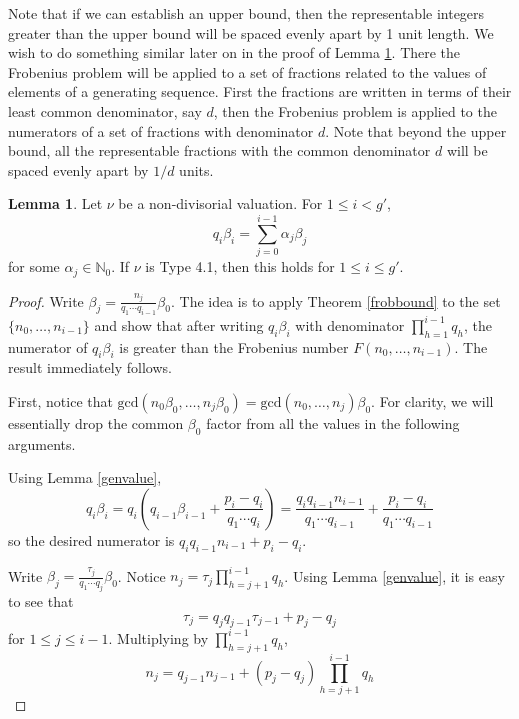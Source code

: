 \documentclass[11pt]{amsart}
\theoremstyle{definition}
\newtheorem{lem}[thm]{Lemma}
\begin{document}
{Note that if we can establish an upper bound, then the representable integers greater than the upper bound will be spaced evenly apart by 1 unit length. We wish to do something similar later on in the proof of Lemma \ref{lowerbeta}. There the Frobenius problem will be applied to a set of fractions related to the values of elements of a generating sequence. First the fractions are written in terms of their least common denominator, say $d$, then the Frobenius problem is applied to the numerators of a set of fractions with denominator $d$. Note that beyond the upper bound, all the representable fractions with the common denominator $d$ will be spaced evenly apart by $1/d$ units.

\begin{lem} \label{lowerbeta} Let $\nu$ be a non-divisorial valuation. For $1\leq i < g'$,
\begin{equation} \label{qibetai}
q_i \beta_i=\sum_{j=0}^{i-1} \alpha_j\beta_j
\end{equation}
for some $\alpha_j\in\mathbb{N}_0$. If $\nu$ is Type 4.1, then this holds for $1\leq i\leq g'$.
\end{lem}
\begin{proof}
Write $\displaystyle \beta_j=\frac{n_j}{q_1\cdots q_{i-1}}\beta_0$. The idea is to apply Theorem \ref{frobbound} to the set $\{n_0,\ldots,n_{i-1}\}$ and show that after writing $q_i\beta_i$ with denominator $\prod_{h=1}^{i-1} q_h$, the numerator of $q_i\beta_i$ is greater than the Frobenius number $F(n_0,\ldots,n_{i-1})$. The result immediately follows.

First, notice that $\text{gcd}(n_0\beta_0,\ldots,n_j\beta_0)=\text{gcd}(n_0,\ldots,n_j)\beta_0$. For clarity, we will essentially drop the common $\beta_0$ factor from all the values in the following arguments.

Using Lemma \ref{genvalue},
\begin{equation*}
q_i\beta_i=q_i\left(q_{i-1}\beta_{i-1}+\frac{p_i-q_i}{q_1\cdots q_i}\right)=\frac{q_iq_{i-1}n_{i-1}}{q_1\cdots q_{i-1}} + \frac{p_i-q_i}{q_1\cdots q_{i-1}}
\end{equation*}
so the desired numerator is $q_iq_{i-1}n_{i-1}+p_i-q_i$.

Write $\displaystyle \beta_j=\frac{\tau_j}{q_1\cdots q_j}\beta_0$. Notice $\displaystyle n_j=\tau_j\prod_{h=j+1}^{i-1} q_h$. Using Lemma \ref{genvalue}, it is easy to see that
\begin{equation} \label{taurecur}
\tau_j=q_jq_{j-1}\tau_{j-1}+p_j-q_j
\end{equation}
for $1\leq j \leq i-1$. Multiplying by $\displaystyle \prod_{h=j+1}^{i-1} q_h$,
\begin{equation} \label{nrecur}
n_j=q_{j-1}n_{j-1}+(p_j-q_j)\prod_{h=j+1}^{i-1} q_h
\end{equation}


\end{proof}}
\end{document}
